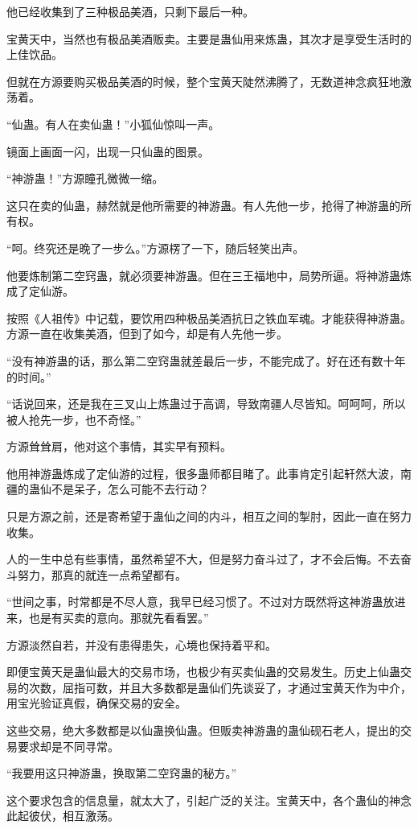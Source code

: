 \begin{this_body}
他已经收集到了三种极品美酒，只剩下最后一种。

宝黄天中，当然也有极品美酒贩卖。主要是蛊仙用来炼蛊，其次才是享受生活时的上佳饮品。

但就在方源要购买极品美酒的时候，整个宝黄天陡然沸腾了，无数道神念疯狂地激荡着。

“仙蛊。有人在卖仙蛊！”小狐仙惊叫一声。

镜面上画面一闪，出现一只仙蛊的图景。

“神游蛊！”方源瞳孔微微一缩。

这只在卖的仙蛊，赫然就是他所需要的神游蛊。有人先他一步，抢得了神游蛊的所有权。

“呵。终究还是晚了一步么。”方源楞了一下，随后轻笑出声。

他要炼制第二空窍蛊，就必须要神游蛊。但在三王福地中，局势所逼。将神游蛊炼成了定仙游。

按照《人祖传》中记载，要饮用四种极品美酒抗日之铁血军魂。才能获得神游蛊。方源一直在收集美酒，但到了如今，却是有人先他一步。

“没有神游蛊的话，那么第二空窍蛊就差最后一步，不能完成了。好在还有数十年的时间。”

“话说回来，还是我在三叉山上炼蛊过于高调，导致南疆人尽皆知。呵呵呵，所以被人抢先一步，也不奇怪。”

方源耸耸肩，他对这个事情，其实早有预料。

他用神游蛊炼成了定仙游的过程，很多蛊师都目睹了。此事肯定引起轩然大波，南疆的蛊仙不是呆子，怎么可能不去行动？

只是方源之前，还是寄希望于蛊仙之间的内斗，相互之间的掣肘，因此一直在努力收集。

人的一生中总有些事情，虽然希望不大，但是努力奋斗过了，才不会后悔。不去奋斗努力，那真的就连一点希望都有。

“世间之事，时常都是不尽人意，我早已经习惯了。不过对方既然将这神游蛊放进来，也是有买卖的意向。那就先看看罢。”

方源淡然自若，并没有患得患失，心境也保持着平和。

即便宝黄天是蛊仙最大的交易市场，也极少有买卖仙蛊的交易发生。历史上仙蛊交易的次数，屈指可数，并且大多数都是蛊仙们先谈妥了，才通过宝黄天作为中介，用宝光验证真假，确保交易的安全。

这些交易，绝大多数都是以仙蛊换仙蛊。但贩卖神游蛊的蛊仙砚石老人，提出的交易要求却是不同寻常。

“我要用这只神游蛊，换取第二空窍蛊的秘方。”

这个要求包含的信息量，就太大了，引起广泛的关注。宝黄天中，各个蛊仙的神念此起彼伏，相互激荡。


\end{this_body}
